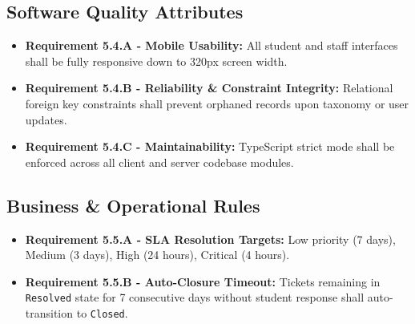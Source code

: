 \documentclass[12pt, a4paper]{article}
\begin{document}
\subsection{Software Quality Attributes}
\begin{itemize}[leftmargin=*]
    \item \textbf{Requirement 5.4.A - Mobile Usability:} All student and staff interfaces shall be fully responsive down to 320px screen width.
    \item \textbf{Requirement 5.4.B - Reliability \& Constraint Integrity:} Relational foreign key constraints shall prevent orphaned records upon taxonomy or user updates.
    \item \textbf{Requirement 5.4.C - Maintainability:} TypeScript strict mode shall be enforced across all client and server codebase modules.
\end{itemize}

\subsection{Business \& Operational Rules}
\begin{itemize}[leftmargin=*]
    \item \textbf{Requirement 5.5.A - SLA Resolution Targets:} Low priority (7 days), Medium (3 days), High (24 hours), Critical (4 hours).
    \item \textbf{Requirement 5.5.B - Auto-Closure Timeout:} Tickets remaining in \texttt{Resolved} state for 7 consecutive days without student response shall auto-transition to \texttt{Closed}.
\end{itemize}
\end{document}
